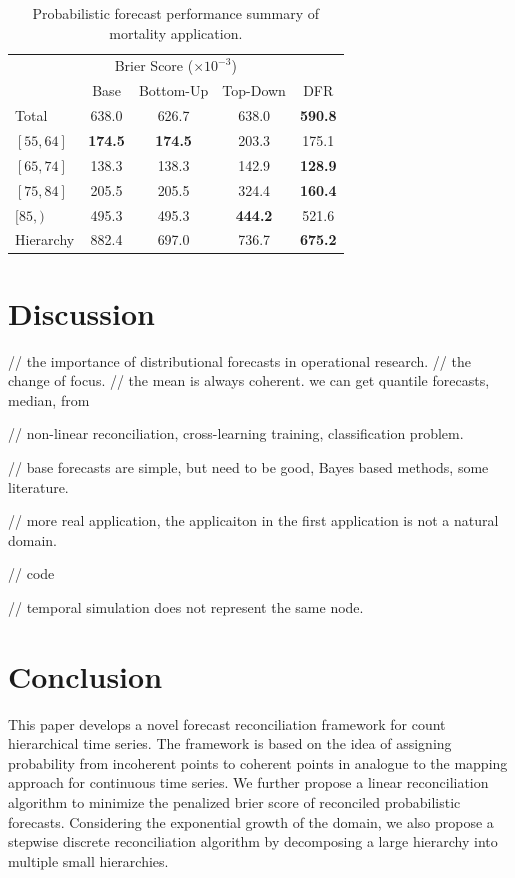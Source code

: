 \documentclass[a4paper,review,12pt,authoryear]{elsarticle}
\begin{document}
     
     \begin{table}
       \centering
       \caption{\label{tab:mortality_age} Probabilistic forecast performance summary of mortality application.}
       \begin{tabular}{lcccc}
       \toprule
       \multicolumn{5}{c}{Brier Score ($\times 10^{-3}$)}\\ 
       & Base & Bottom-Up & Top-Down & DFR \\\midrule
       Total & 638.0 & 626.7 & 638.0 & \textbf{590.8} \\
       $[55, 64]$ & \textbf{174.5} & \textbf{174.5} & 203.3 & 175.1 \\
       $[65, 74]$ & 138.3 & 138.3 & 142.9 & \textbf{128.9}\\
       $[75, 84]$ & 205.5 & 205.5 & 324.4 & \textbf{160.4}\\
       $[85, )$ & 495.3 & 495.3 & \textbf{444.2} & 521.6\\
       Hierarchy & 882.4 & 697.0 & 736.7 & \textbf{675.2} \\
       \bottomrule
      \end{tabular}
     \end{table}

     \section{Discussion}

     // the importance of distributional forecasts in operational research.
     // the change of focus.
     // the mean is always coherent. we can get quantile forecasts, median, from 

     // non-linear reconciliation, cross-learning training, classification problem.

     // base forecasts are simple, but need to be good, Bayes based methods, some literature.

     // more real application, the applicaiton in the first application is not a natural domain.

     // code
     
     // temporal simulation does not represent the same node.

     \section{Conclusion}
     \label{sec:conclusion}
     
     This paper develops a novel forecast reconciliation framework for count hierarchical time series. 
     The framework is based on the idea of assigning probability from incoherent points to coherent points in analogue to the mapping approach for continuous time series.
     We further propose a linear reconciliation algorithm to minimize the penalized brier score of reconciled probabilistic forecasts.
     Considering the exponential growth of the domain, we also propose a stepwise discrete reconciliation algorithm by decomposing a large hierarchy into multiple small hierarchies.
     
\end{document}
